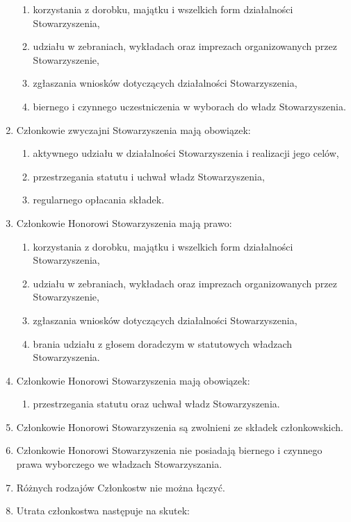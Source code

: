 \documentclass{article}
\begin{document}
\begin{enumerate}
\begin{enumerate}
        \item korzystania z dorobku, majątku i wszelkich form działalności Stowarzyszenia,
        \item udziału w zebraniach, wykładach oraz imprezach organizowanych przez Stowarzyszenie,
        \item zgłaszania wniosków dotyczących działalności Stowarzyszenia,
        \item biernego i czynnego uczestniczenia w wyborach do władz Stowarzyszenia.
      \end{enumerate}
    \item Członkowie zwyczajni Stowarzyszenia mają obowiązek:
      \begin{enumerate}
        \item aktywnego udziału w działalności Stowarzyszenia i realizacji jego celów,
        \item przestrzegania statutu i uchwał władz Stowarzyszenia,
        \item regularnego opłacania składek.
      \end{enumerate}
    \item Członkowie Honorowi Stowarzyszenia mają prawo:
      \begin{enumerate}
        \item korzystania z dorobku, majątku i wszelkich form działalności Stowarzyszenia,
        \item udziału w zebraniach, wykładach oraz imprezach organizowanych przez Stowarzyszenie,
        \item zgłaszania wniosków dotyczących działalności Stowarzyszenia,
        \item brania udziału z głosem doradczym w statutowych władzach Stowarzyszenia.
      \end{enumerate}
    \item Członkowie Honorowi Stowarzyszenia mają obowiązek:
      \begin{enumerate}
        \item przestrzegania statutu oraz uchwał władz Stowarzyszenia.
      \end{enumerate}
    \item Członkowie Honorowi Stowarzyszenia są zwolnieni ze składek członkowskich.
    \item Członkowie Honorowi Stowarzyszenia nie posiadają biernego i czynnego prawa wyborczego we władzach Stowarzyszania.
    \item Różnych rodzajów Członkostw nie można łączyć.
    \item Utrata członkostwa następuje na skutek:

\end{enumerate}
\end{document}
